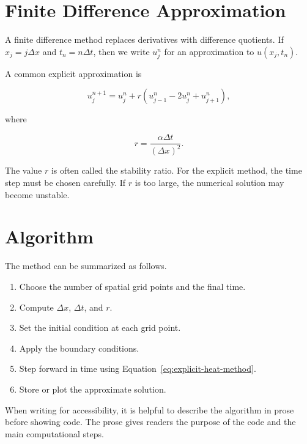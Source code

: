\section{Finite Difference Approximation}
\label{sec:finite-difference-approximation}

A finite difference method replaces derivatives with difference quotients. If \(x_j=j\Delta x\) and \(t_n=n\Delta t\), then we write \(u_j^n\) for an approximation to \(u(x_j,t_n)\).

A common explicit approximation is

\begin{equation}
u_j^{n+1}
=
u_j^n
+
r\left(u_{j-1}^n-2u_j^n+u_{j+1}^n\right),
\label{eq:explicit-heat-method}
\end{equation}

where

\begin{equation}
r=\frac{\alpha\Delta t}{(\Delta x)^2}.
\label{eq:stability-ratio}
\end{equation}

The value \(r\) is often called the stability ratio. For the explicit method, the time step must be chosen carefully. If \(r\) is too large, the numerical solution may become unstable.

\section{Algorithm}
\label{sec:computational-algorithm}

The method can be summarized as follows.

\begin{enumerate}
  \item Choose the number of spatial grid points and the final time.
  \item Compute \(\Delta x\), \(\Delta t\), and \(r\).
  \item Set the initial condition at each grid point.
  \item Apply the boundary conditions.
  \item Step forward in time using Equation~\ref{eq:explicit-heat-method}.
  \item Store or plot the approximate solution.
\end{enumerate}

When writing for accessibility, it is helpful to describe the algorithm in prose before showing code. The prose gives readers the purpose of the code and the main computational steps.

